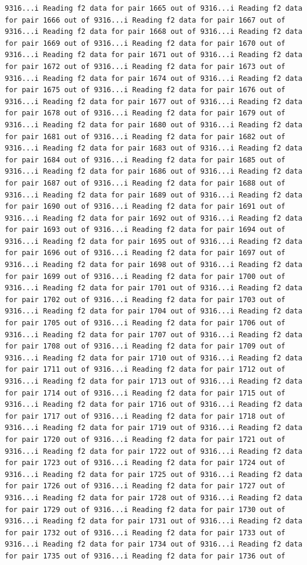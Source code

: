 \documentclass[
]{article}
\begin{document}
\begin{verbatim}
9316...i Reading f2 data for pair 1665 out of 9316...i Reading f2 data for pair 1666 out of 9316...i Reading f2 data for pair 1667 out of 9316...i Reading f2 data for pair 1668 out of 9316...i Reading f2 data for pair 1669 out of 9316...i Reading f2 data for pair 1670 out of 9316...i Reading f2 data for pair 1671 out of 9316...i Reading f2 data for pair 1672 out of 9316...i Reading f2 data for pair 1673 out of 9316...i Reading f2 data for pair 1674 out of 9316...i Reading f2 data for pair 1675 out of 9316...i Reading f2 data for pair 1676 out of 9316...i Reading f2 data for pair 1677 out of 9316...i Reading f2 data for pair 1678 out of 9316...i Reading f2 data for pair 1679 out of 9316...i Reading f2 data for pair 1680 out of 9316...i Reading f2 data for pair 1681 out of 9316...i Reading f2 data for pair 1682 out of 9316...i Reading f2 data for pair 1683 out of 9316...i Reading f2 data for pair 1684 out of 9316...i Reading f2 data for pair 1685 out of 9316...i Reading f2 data for pair 1686 out of 9316...i Reading f2 data for pair 1687 out of 9316...i Reading f2 data for pair 1688 out of 9316...i Reading f2 data for pair 1689 out of 9316...i Reading f2 data for pair 1690 out of 9316...i Reading f2 data for pair 1691 out of 9316...i Reading f2 data for pair 1692 out of 9316...i Reading f2 data for pair 1693 out of 9316...i Reading f2 data for pair 1694 out of 9316...i Reading f2 data for pair 1695 out of 9316...i Reading f2 data for pair 1696 out of 9316...i Reading f2 data for pair 1697 out of 9316...i Reading f2 data for pair 1698 out of 9316...i Reading f2 data for pair 1699 out of 9316...i Reading f2 data for pair 1700 out of 9316...i Reading f2 data for pair 1701 out of 9316...i Reading f2 data for pair 1702 out of 9316...i Reading f2 data for pair 1703 out of 9316...i Reading f2 data for pair 1704 out of 9316...i Reading f2 data for pair 1705 out of 9316...i Reading f2 data for pair 1706 out of 9316...i Reading f2 data for pair 1707 out of 9316...i Reading f2 data for pair 1708 out of 9316...i Reading f2 data for pair 1709 out of 9316...i Reading f2 data for pair 1710 out of 9316...i Reading f2 data for pair 1711 out of 9316...i Reading f2 data for pair 1712 out of 9316...i Reading f2 data for pair 1713 out of 9316...i Reading f2 data for pair 1714 out of 9316...i Reading f2 data for pair 1715 out of 9316...i Reading f2 data for pair 1716 out of 9316...i Reading f2 data for pair 1717 out of 9316...i Reading f2 data for pair 1718 out of 9316...i Reading f2 data for pair 1719 out of 9316...i Reading f2 data for pair 1720 out of 9316...i Reading f2 data for pair 1721 out of 9316...i Reading f2 data for pair 1722 out of 9316...i Reading f2 data for pair 1723 out of 9316...i Reading f2 data for pair 1724 out of 9316...i Reading f2 data for pair 1725 out of 9316...i Reading f2 data for pair 1726 out of 9316...i Reading f2 data for pair 1727 out of 9316...i Reading f2 data for pair 1728 out of 9316...i Reading f2 data for pair 1729 out of 9316...i Reading f2 data for pair 1730 out of 9316...i Reading f2 data for pair 1731 out of 9316...i Reading f2 data for pair 1732 out of 9316...i Reading f2 data for pair 1733 out of 9316...i Reading f2 data for pair 1734 out of 9316...i Reading f2 data for pair 1735 out of 9316...i Reading f2 data for pair 1736 out of 
\end{verbatim}
\end{document}
